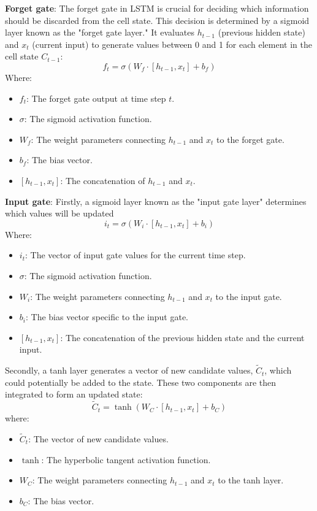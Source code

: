 \documentclass{ieeeojies}
\begin{document}
\textbf{Forget gate}: The forget gate in LSTM is crucial for deciding which information should be discarded from the cell state. This decision is determined by a sigmoid layer known as the "forget gate layer." It evaluates \( h_{t-1} \) (previous hidden state) and \( x_t \) (current input) to generate values between 0 and 1 for each element in the cell state \( C_{t-1} \):
\[
f_t = \sigma(W_f \cdot [h_{t-1}, x_t] + b_f)
\]
Where:
\begin{itemize}
  \item \( f_t \): The forget gate output at time step \( t \).
  \item \( \sigma \): The sigmoid activation function.
  \item \( W_f \): The weight parameters connecting \( h_{t-1} \) and \( x_t \) to the forget gate.
  \item \( b_f \): The bias vector.
  \item \( [h_{t-1}, x_t] \): The concatenation of \( h_{t-1} \) and \( x_t \).
\end{itemize}
\textbf{Input gate}: Firstly, a sigmoid layer known as the "input gate layer" determines which values will be updated
\[
i_t = \sigma(W_i \cdot [h_{t-1}, x_t] + b_i)
\]
Where:
\begin{itemize}
  \item \( i_t \): The vector of input gate values for the current time step.
  \item \( \sigma \): The sigmoid activation function.
  \item \( W_i \): The weight parameters connecting \( h_{t-1} \) and \( x_t \) to the input gate.
  \item \( b_i \): The bias vector specific to the input gate.
  \item \( [h_{t-1}, x_t] \): The concatenation of the previous hidden state and the current input.
\end{itemize}
Secondly, a tanh layer generates a vector of new candidate values, \( \tilde{C}_t \), which could potentially be added to the state. These two components are then integrated to form an updated state:
\[
\tilde{C}_t = \tanh(W_C \cdot [h_{t-1}, x_t] + b_C)
\]
where:
\begin{itemize}
  \item \( \tilde{C}_t \): The vector of new candidate values.
  \item \( \tanh \): The hyperbolic tangent activation function.
  \item \( W_C \): The weight parameters connecting \( h_{t-1} \) and \( x_t \) to the tanh layer.
  \item \( b_C \): The bias vector.
\end{itemize}
\end{document}
